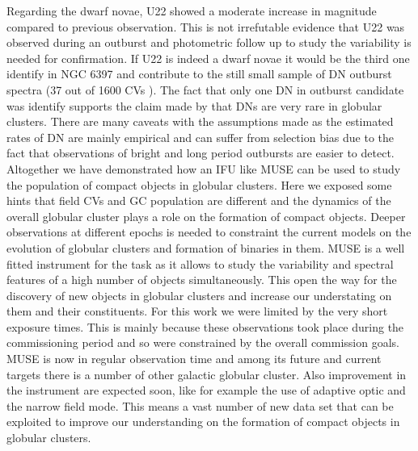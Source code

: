  Regarding the dwarf novae, U22 showed a moderate increase in magnitude compared to previous observation. This is not irrefutable evidence that U22 was observed during an outburst and photometric follow up to study the variability is needed for confirmation. If U22 is indeed a dwarf novae it would be the third one identify in NGC 6397 \citep{shara_erupting_2005} and contribute to the still small sample of DN outburst spectra (37 out of 1600 CVs \citep{2001PASP..113..764D}). The fact that only one DN in outburst candidate was identify supports the claim made by \cite{shara_CVsDN_1996} that DNs are very rare in globular clusters. There are many caveats with the assumptions made as the estimated rates of DN are mainly empirical and can suffer from selection bias due to the fact that observations of bright and long period outbursts are easier to detect. \\ 

Altogether we have demonstrated how an IFU like MUSE can be used to study the population of compact objects in globular clusters. Here we exposed some hints that field CVs and GC population are different and the dynamics of the overall globular cluster plays a role on the formation of compact objects. Deeper observations at different epochs is needed to constraint the current models on the evolution of globular clusters and formation of binaries in them. MUSE is a well fitted instrument for the task as it allows to study the variability and spectral features of a high number of objects simultaneously. This open the way for the discovery of new objects in globular clusters and increase our understating on them and their constituents. For this work we were limited by the very short exposure times. This is mainly because these observations took place during the commissioning period and so were constrained by the overall commission goals. MUSE is now in regular observation time and among its future and current targets there is a number of other galactic globular cluster. Also improvement in the instrument are expected soon, like for example the use of adaptive optic and the narrow field mode. This means  a vast number of new data set that can be exploited to improve our understanding on the formation of compact objects in globular clusters. 

